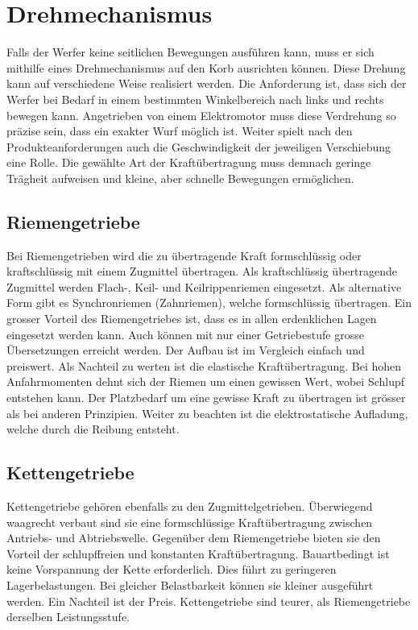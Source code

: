 \section{Drehmechanismus}
Falls der Werfer keine seitlichen Bewegungen ausführen kann, muss er sich mithilfe eines Drehmechanismus auf den Korb ausrichten können. Diese Drehung kann auf verschiedene Weise realisiert werden. Die Anforderung ist, dass sich der Werfer bei Bedarf in einem bestimmten Winkelbereich nach links und rechts bewegen kann. Angetrieben von einem Elektromotor muss diese Verdrehung so präzise sein, dass ein exakter Wurf möglich ist. Weiter spielt nach den Produkteanforderungen auch die Geschwindigkeit der jeweiligen Verschiebung eine Rolle. Die gewählte Art der Kraftübertragung muss demnach geringe Trägheit aufweisen und kleine, aber schnelle Bewegungen ermöglichen. 
 
\subsection{Riemengetriebe}
Bei Riemengetrieben wird die zu übertragende Kraft formschlüssig oder kraftschlüssig mit einem Zugmittel übertragen. Als kraftschlüssig übertragende Zugmittel werden Flach-, Keil- und Keilrippenriemen eingesetzt. Als alternative Form gibt es Synchronriemen (Zahnriemen), welche formschlüssig übertragen. Ein grosser Vorteil des Riemengetriebes ist, dass es in allen erdenklichen Lagen eingesetzt werden kann. Auch können mit nur einer Getriebestufe grosse Übersetzungen erreicht werden. Der Aufbau ist im Vergleich einfach und preiswert. Als Nachteil zu werten ist die elastische Kraftübertragung. Bei hohen Anfahrmomenten dehnt sich der Riemen um einen gewissen Wert, wobei Schlupf entstehen kann. Der Platzbedarf um eine gewisse Kraft zu übertragen ist grösser als bei anderen Prinzipien. Weiter zu beachten ist die elektrostatische Aufladung, welche durch die Reibung entsteht. 
 
\subsection{Kettengetriebe}
Kettengetriebe gehören ebenfalls zu den Zugmittelgetrieben. Überwiegend waagrecht verbaut sind sie eine formschlüssige Kraftübertragung zwischen Antriebs- und Abtriebswelle. Gegenüber dem Riemengetriebe bieten sie den Vorteil der schlupffreien und konstanten Kraftübertragung. Bauartbedingt ist keine Vorspannung der Kette erforderlich. Dies führt zu geringeren Lagerbelastungen. Bei gleicher Belastbarkeit können sie kleiner ausgeführt werden. Ein Nachteil ist der Preis. Kettengetriebe sind teurer, als Riemengetriebe derselben Leistungsstufe.

